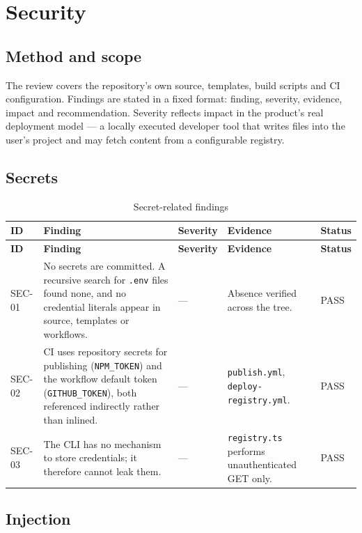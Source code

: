 \chapter{Security}
\label{ch:security}

\section{Method and scope}

The review covers the repository's own source, templates, build scripts and CI
configuration. Findings are stated in a fixed format: finding, severity, evidence,
impact and recommendation. Severity reflects impact in the product's real deployment
model --- a locally executed developer tool that writes files into the user's
project and may fetch content from a configurable registry.

\section{Secrets}

\begin{longtable}{@{}L{1.3cm}L{3.4cm}L{1.9cm}L{6.1cm}L{1.5cm}@{}}
\caption{Secret-related findings}\\
\toprule
\textbf{ID} & \textbf{Finding} & \textbf{Severity} & \textbf{Evidence} & \textbf{Status} \\
\midrule
\endfirsthead
\toprule
\textbf{ID} & \textbf{Finding} & \textbf{Severity} & \textbf{Evidence} & \textbf{Status} \\
\midrule
\endhead
SEC-01 & No secrets are committed. A recursive search for \texttt{.env} files found
none, and no credential literals appear in source, templates or workflows. & --- &
Absence verified across the tree. & PASS \\
SEC-02 & CI uses repository secrets for publishing
(\texttt{NPM\_TOKEN}) and the workflow default token
(\texttt{GITHUB\_TOKEN}), both referenced indirectly rather than inlined. &
--- & \texttt{publish.yml}, \texttt{deploy-registry.yml}. & PASS \\
SEC-03 & The CLI has no mechanism to store credentials; it therefore cannot leak
them. & --- & \texttt{registry.ts} performs unauthenticated GET only. & PASS \\
\bottomrule
\end{longtable}

\section{Injection}

